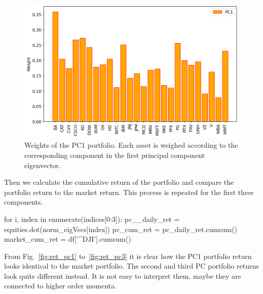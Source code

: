 \begin{figure}[htb]
	\centering
	\includegraphics[width=.7\textwidth]{figures/portfolio_pca_pc1_weights}
	\caption{Weights of the PC1 portfolio. Each asset is weighed according
		to the corresponding component in the first principal component
		eigenvector.}
	\label{fig:pca_weights}
\end{figure}
	
Then we calculate the cumulative return of the portfolio and compare the portfolio return to the market return. This process is repeated for the first three components.

\begin{ipython}
for i, index in enumerate(indices[0:3]):
    pc__daily_ret = equities.dot(norm_eigVecs[index])
    pc_cum_ret = pc_daily_ret.cumsum()
    market_cum_ret = df['^DJI'].cumsum()
\end{ipython}
	
From Fig.~\ref{fig:ret_pc1} to~\ref{fig:ret_pc3} it is clear how the PC1 portfolio return looks identical to the market portfolio. The second and third PC portfolio returns look quite different instead. It is not easy to interpret them, maybe they are connected to higher order momenta. 


